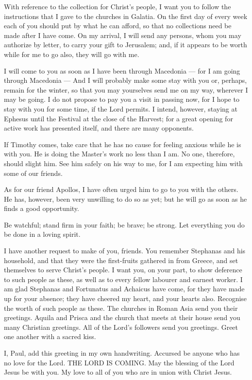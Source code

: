  With reference to the collection for Christ's people, I
want you to follow the instructions that I gave to the churches in
Galatia.  On the first day of every week each of you should
put by what he can afford, so that no collections need be made after I
have come.  On my arrival, I will send any persons, whom you
may authorize by letter, to carry your gift to Jerusalem; 
and, if it appears to be worth while for me to go also, they will go
with me.

 I will come to you as soon as I have been through Macedonia
--- for I am going through Macedonia ---  And I will
probably make some stay with you or, perhaps, remain for the winter, so
that you may yourselves send me on my way, wherever I may be going.
 I do not propose to pay you a visit in passing now, for I
hope to stay with you for some time, if the Lord permits.  I
intend, however, staying at Ephesus until the Festival at the close of
the Harvest;  for a great opening for active work has
presented itself, and there are many opponents.

 If Timothy comes, take care that he has no cause for
feeling anxious while he is with you. He is doing the Master's work no
less than I am.  No one, therefore, should slight him. See
him safely on his way to me, for I am expecting him with some of our
friends.

 As for our friend Apollos, I have often urged him to go to
you with the others. He has, however, been very unwilling to do so as
yet; but he will go as soon as he finds a good opportunity.

 Be watchful; stand firm in your faith; be brave; be
strong.  Let everything you do be done in a loving spirit.

 I have another request to make of you, friends. You
remember Stephanas and his household, and that they were the
first-fruits gathered in from Greece, and set themselves to serve
Christ's people.  I want you, on your part, to show
deference to such people as these, as well as to every fellow labourer
and earnest worker.  I am glad Stephanas and Fortunatus and
Achaicus have come, for they have made up for your absence;
 they have cheered my heart, and your hearts also.
Recognise the worth of such people as these.  The churches
in Roman Asia send you their greetings. Aquila and Prisca and the church
that meets at their house send you many Christian greetings.
 All of the Lord's followers send you greetings. Greet one
another with a sacred kiss.

 I, Paul, add this greeting in my own handwriting.
 Accursed be anyone who has no love for the Lord. THE LORD
IS COMING.  May the blessing of the Lord Jesus be with you.
 My love to all of you who are in union with Christ Jesus.
